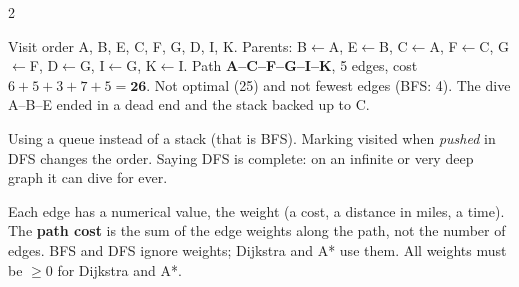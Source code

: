 \begin{multicols}{2}
\begin{worked}
Visit order A, B, E, C, F, G, D, I, K. Parents: B$\leftarrow$A, E$\leftarrow$B, C$\leftarrow$A, F$\leftarrow$C, G$\leftarrow$F, D$\leftarrow$G, I$\leftarrow$G, K$\leftarrow$I. Path \textbf{A--C--F--G--I--K}, 5 edges, cost $6+5+3+7+5=\mathbf{26}$. Not optimal (25) and not fewest edges (BFS: 4). The dive A--B--E ended in a dead end and the stack backed up to C. \chk
\end{worked}
\begin{trap}
Using a queue instead of a stack (that is BFS). Marking visited when \emph{pushed} in DFS changes the order. Saying DFS is complete: on an infinite or very deep graph it can dive for ever.
\end{trap}

Each edge has a numerical value, the weight (a cost, a distance in miles, a time). The \textbf{path cost} is the sum of the edge weights along the path, not the number of edges. BFS and DFS ignore weights; Dijkstra and A* use them. All weights must be $\ge0$ for Dijkstra and A*.


\end{multicols}
